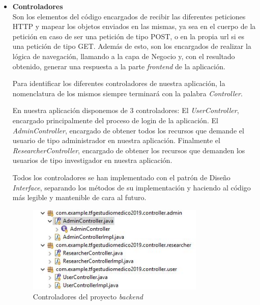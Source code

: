         \begin{itemize}
            \item\textbf{Controladores}  \\
            Son los elementos del código encargados de recibir las diferentes peticiones HTTP y mapear los objetos enviados en las mismas, ya sea en el cuerpo de la petición en caso de ser una petición de tipo POST, o en la propia url si es una petición de tipo GET. Además de esto, son los encargados de realizar la lógica de navegación, llamando a la capa de Negocio y, con el resultado obtenido, generar una respuesta a la parte \textit{frontend} de la aplicación.
            \newline
            
            Para identificar los diferentes controladores de nuestra aplicación, la nomenclatura de los mismos siempre terminará con la palabra \textit{Controller}.
            \newline
            
            En nuestra aplicación disponemos de 3 controladores: El \textit{UserController}, encargado principalmente del proceso de login de la aplicación. El \textit{AdminController}, encargado de obtener todos los recursos que demande el usuario de tipo administrador en nuestra aplicación. Finalmente el \textit{ResearcherController}, encargado de obtener los recursos que demanden los usuarios de tipo investigador en nuestra aplicación.
            \newline
            
            Todos los controladores se han implementado con el patrón de Diseño \textit{Interface}, separando los métodos de su implementación y haciendo al código más legible y mantenible de cara al futuro.
            \newline
            
                \begin{figure}[h]
                    \centering
                     \includegraphics[width=0.8\textwidth]{images/controllers.JPG}
                    \caption{Controladores del proyecto \textit{backend}}
                \end{figure}
                

\end{itemize}
